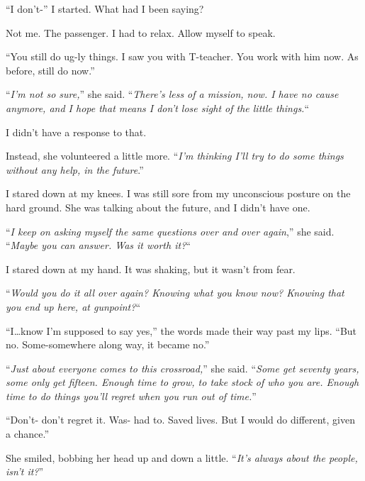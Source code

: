 ``I don't-'' I started.  What had I been saying?



Not me.  The passenger.  I had to relax.  Allow myself to speak.



``You still do ug-ly things.  I saw you with T-teacher.  You work with him now.  As before, still do now.''



``\emph{I'm not so sure,}'' she said.  ``\emph{There's less of a mission, now.  I have no cause anymore, and I hope that means I don't lose sight of the little things.}``



I didn't have a response to that.



Instead, she volunteered a little more.  ``\emph{I'm thinking I'll try to do some things without any help, in the future}.''



I stared down at my knees.  I was still sore from my unconscious posture on the hard ground.  She was talking about the future, and I didn't have one.



``\emph{I keep on asking myself the same questions over and over again},'' she said.  ``\emph{Maybe you can answer.  Was it worth it?}``



I stared down at my hand.  It was shaking, but it wasn't from fear.



``\emph{Would you do it all over again?  Knowing what you know now?  Knowing that you end up here, at gunpoint?}``



``I\ldots know I'm supposed to say yes,'' the words made their way past my lips.  ``But no.  Some-somewhere along way, it became no.''



``\emph{Just about everyone comes to this crossroad,}'' she said.  ``\emph{Some get seventy years, some only get fifteen.  Enough time to grow, to take stock of who you are.  Enough time to do things you'll regret when you run out of time.}''



``Don't- don't regret it.  Was- had to.  Saved lives.  But I would do different, given a chance.''



She smiled, bobbing her head up and down a little.  ``\emph{It's always about the people, isn't it?}''



